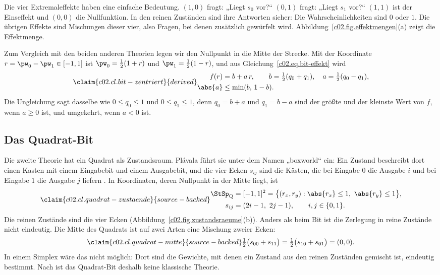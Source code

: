 Die vier Extremaleffekte haben eine einfache Bedeutung. $(1,0)$ fragt: „Liegt $s_0$ vor?“
$(0,1)$ fragt: „Liegt $s_1$ vor?“ $(1,1)$ ist der Einseffekt und $(0,0)$ die Nullfunktion.
In den reinen Zuständen sind ihre Antworten sicher: Die Wahrscheinlichkeiten sind $0$ oder
$1$. Die übrigen Effekte sind Mischungen dieser vier, also Fragen, bei denen zusätzlich
gewürfelt wird. Abbildung~\ref{c02.fig.effektmengen}(a) zeigt die Effektmenge.

Zum Vergleich mit den beiden anderen Theorien legen wir den Nullpunkt in die Mitte der
Strecke. Mit der Koordinate $r = \pw_0 - \pw_1 \in [-1,1]$ ist
$\pw_0 = \tfrac12(1+r)$ und $\pw_1 = \tfrac12(1-r)$, und aus
Gleichung~\eqref{c02.eq.bit-effekt} wird
\begin{equation}\label{c02.eq.bit-zentriert}\claim{c02.cl.bit-zentriert}{derived}
  \begin{aligned}
    f(r) &= b + a\, r, \qquad b = \tfrac12(q_0 + q_1), \quad a = \tfrac12(q_0 - q_1), \\
    \abs{a} &\leq \min(b,\, 1-b) .
  \end{aligned}
\end{equation}
Die Ungleichung sagt dasselbe wie $0 \leq q_0 \leq 1$ und $0 \leq q_1 \leq 1$, denn
$q_0 = b + a$ und $q_1 = b - a$ sind der größte und der kleinste Wert von $f$, wenn
$a \geq 0$ ist, und umgekehrt, wenn $a < 0$ ist.

\subsection{Das Quadrat-Bit}\label{c02.s4.2}

Die zweite Theorie hat ein Quadrat als Zustandsraum. Plávala führt sie unter dem Namen
„boxworld“ ein: Ein Zustand beschreibt dort einen Kasten mit einem Eingabebit und einem
Ausgabebit, und die vier Ecken $s_{ij}$ sind die Kästen, die bei Eingabe $0$ die Ausgabe
$i$ und bei Eingabe $1$ die Ausgabe $j$ liefern
. In Koordinaten, deren
Nullpunkt in der Mitte liegt, ist
\begin{equation}\label{c02.eq.quadrat}\claim{c02.cl.quadrat-zustaende}{source-backed}
  \begin{aligned}
    \StSp_{\mathrm{Q}} &= [-1,1]^2 = \bigl\{ (r_x, r_y) : \abs{r_x} \leq 1,\ \abs{r_y} \leq 1 \bigr\}, \\
    s_{ij} &= (2i-1,\ 2j-1), \qquad i, j \in \{0,1\} .
  \end{aligned}
\end{equation}
Die reinen Zustände sind die vier Ecken (Abbildung~\ref{c02.fig.zustandsraeume}(b)). Anders
als beim Bit ist die Zerlegung in reine Zustände nicht eindeutig. Die Mitte des Quadrats
ist auf zwei Arten eine Mischung zweier Ecken:
\begin{equation}\label{c02.eq.quadrat-mitte}\claim{c02.cl.quadrat-mitte}{source-backed}
  \tfrac12\bigl(s_{00} + s_{11}\bigr) = \tfrac12\bigl(s_{10} + s_{01}\bigr) = (0,0) .
\end{equation}
In einem Simplex wäre das nicht möglich: Dort sind die Gewichte, mit denen ein Zustand aus
den reinen Zuständen gemischt ist, eindeutig bestimmt. Nach  ist das Quadrat-Bit
deshalb keine klassische Theorie.

